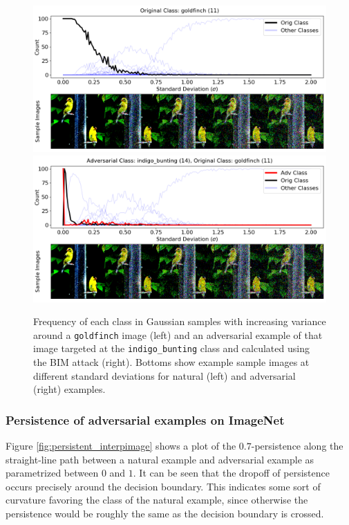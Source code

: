 \begin{figure}[ht]
\centering
\includegraphics[width = .49\textwidth]{./c3_figures/ILSVRC2012_val_00001274-vgg16-sampling.png}
\includegraphics[width = .49\textwidth]{./c3_figures/IMNET-class-11-vgg16-BIM-48-attack_data-023.png}

\caption{Frequency of each class in Gaussian samples with increasing variance around a \texttt{goldfinch} image (left) and an adversarial example of that image targeted at the \texttt{indigo\_bunting} class and calculated using the BIM attack (right). Bottoms show example sample images at different standard deviations for natural (left) and adversarial (right) examples.}
\label{fig:imagenet_adv}
\end{figure}

\subsubsection{Persistence of adversarial examples on ImageNet}

Figure \ref{fig:persistent_interpimage} shows a plot of the $0.7$-persistence along the straight-line path between a natural example and adversarial example as parametrized between $0$ and $1$. It can be seen that the dropoff of persistence occurs precisely around the decision boundary. This indicates some sort of curvature favoring the class of the natural example, since otherwise the persistence would be roughly the same as the decision boundary is crossed.

